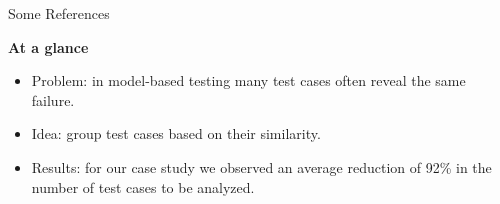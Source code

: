 \documentclass[final,hyperref={pdfpagelabels=false}]{beamer}
\begin{document}
\begin{frame}
\begin{minipage}{0.64\textwidth}
  \begin{block}{Some References}
    
      
  \end{block}
\end{minipage}
\quad
  \begin{minipage}{0.34\textwidth}
   \begin{alertblock}{\textbf{At a glance}}
    \begin{itemize}
    \item Problem: in model-based testing many test cases often reveal
      the same failure.
      \item Idea: group test cases based on their similarity.
      \item Results: for our case study we observed an average
        reduction of 92\% in the number of test cases to be analyzed.
    \end{itemize}
  \end{alertblock}
  \end{minipage}


\end{frame}                                            
\end{document}
